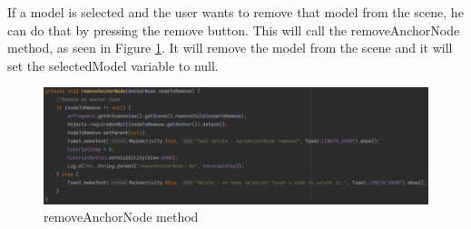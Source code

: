 If a model is selected and the user wants to remove that model from the scene, he can do that by pressing the remove button. This will call the removeAnchorNode method, as seen in Figure \ref{fig:removeAnchorNode}. It will remove the model from the scene and it will set the selectedModel variable to null.

\begin{figure}[H]
    \centering
    \includegraphics[width=1\textwidth]{img/code/removeAnchorNode.png}
    \caption{removeAnchorNode method}
    \label{fig:removeAnchorNode}
\end{figure}